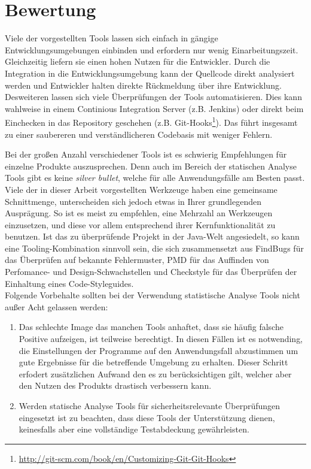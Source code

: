 \section{Bewertung}
Viele der vorgestellten Tools lassen sich einfach in gängige Entwicklungsumgebungen einbinden und erfordern nur wenig Einarbeitungszeit. Gleichzeitig liefern sie einen hohen Nutzen für die Entwickler. 
Durch die Integration in die Entwicklungsumgebung kann der Quellcode direkt analysiert werden und Entwickler halten direkte Rückmeldung über ihre Entwicklung. Desweiteren lassen sich viele Überprüfungen der Tools automatisieren. Dies kann wahlweise in einem Continious Integration Server (z.B. Jenkins) oder direkt beim Einchecken in das Repository geschehen (z.B. Git-Hooks\footnote{\url{http://git-scm.com/book/en/Customizing-Git-Git-Hooks}}). Das führt insgesamt zu einer saubereren und verständlicheren Codebasis mit weniger Fehlern.

Bei der großen Anzahl verschiedener Tools ist es schwierig Empfehlungen für einzelne Produkte auszusprechen. Denn auch im Bereich der statischen Analyse Tools gibt es keine \emph{silver bullet}, welche für alle Anwendungsfälle am Besten passt. Viele der in dieser Arbeit vorgestellten Werkzeuge haben eine gemeinsame Schnittmenge, unterscheiden sich jedoch etwas in Ihrer grundlegenden Ausprägung. So ist es meist zu empfehlen, eine Mehrzahl an Werkzeugen einzusetzen, und diese vor allem entsprechend ihrer Kernfunktionalität zu benutzen.
Ist das zu überprüfende Projekt in der Java-Welt angesiedelt, so kann eine Tooling-Kombination sinnvoll sein, die sich zusammensetzt aus FindBugs für das Überprüfen auf bekannte Fehlermuster, PMD für das Auffinden von Perfomance- und Design-Schwachstellen und Checkstyle für das Überprüfen der Einhaltung eines Code-Styleguides.\\

Folgende Vorbehalte sollten bei der Verwendung statistische Analyse Tools nicht außer Acht gelassen werden:
\begin{enumerate}
  \item Das schlechte Image das manchen Tools anhaftet, dass sie häufig falsche Positive aufzeigen, ist teilweise berechtigt. In diesen Fällen ist es notwending, die Einstellungen der Programme auf den Anwendungsfall abzustimmen um gute Ergebnisse für die betreffende Umgebung zu erhalten. Dieser Schritt erfodert zusätzlichen Aufwand den es zu berücksichtigen gilt, welcher aber den Nutzen des Produkts drastisch verbessern kann.
  \item Werden statische Analyse Tools für sicherheitsrelevante Überprüfungen eingesetzt ist zu beachten, dass diese Tools der Unterstützung dienen, keinesfalls aber eine vollständige Testabdeckung gewährleisten.
\end{enumerate}

